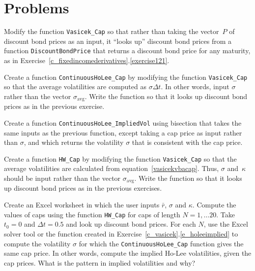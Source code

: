 


\section*{Problems}
\begin{prob} Modify the function \verb!Vasicek_Cap! so that rather than taking the vector~$P$ of discount bond prices as an input, it ``looks up'' discount bond prices from a function \verb!DiscountBondPrice! that returns a discount bond price for any maturity, as in Exercise~\ref{c_fixedincomederivatives}.\ref{exercise121}.
\end{prob}\begin{prob} Create a function \verb!ContinuousHoLee_Cap! by modifying the function \verb!Vasicek_Cap! so that the average volatilities are computed as $\sigma\varDelta t$.  In other words, input $\sigma$ rather than the vector $\sigma_{\text{avg}}$.  Write the function so that it looks up discount bond prices as in the previous exercise.
\end{prob}\begin{prob} Create a function \verb!ContinuousHoLee_ImpliedVol! using bisection that takes the same inputs as the previous function, except taking a cap price as input rather than $\sigma$, and which returns the volatility $\sigma$ that is consistent with the cap price.\label{e_holeeimplied}
\end{prob}\begin{prob} Create a function \verb!HW_Cap! by modifying the function \verb!Vasicek_Cap! so that the average volatilities are calculated from equation~\eqref{vasicekvbacap}.  Thus, $\sigma$ and~$\kappa$ should be input rather than the vector $\sigma_{\text{avg}}$.  Write the function so that it looks up discount bond prices as in the previous exercises.
\end{prob}\begin{prob} Create an Excel worksheet in which the user inputs $\bar{r}$, $\sigma$ and $\kappa$.  Compute the values of caps using the function \verb!HW_Cap! for caps of length $N = 1, \ldots 20$.  Take $t_0=0$ and $\varDelta t=0.5$ and look up discount bond prices.  For each $N$, use the Excel solver tool or the function created in Exercise~\ref{c_vasicek}.\ref{e_holeeimplied} to compute the volatility $\sigma$ for which the \verb!ContinuousHoLee_Cap! function gives the same cap price.  In other words, compute the implied Ho-Lee volatilities, given the cap prices.  What is the pattern in implied volatilities and why?

\end{prob}
